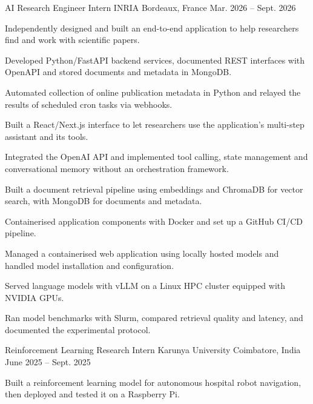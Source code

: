 
\begin{cventries}
  \cventry
    {AI Research Engineer Intern}
    {INRIA}
    {Bordeaux, France}
    {Mar. 2026 -- Sept. 2026}
    {
      \begin{cvitems}
        \item {Independently designed and built an end-to-end application to help researchers find and work with scientific papers.}
        \item {Developed Python/FastAPI backend services, documented REST interfaces with OpenAPI and stored documents and metadata in MongoDB.}
        \item {Automated collection of online publication metadata in Python and relayed the results of scheduled cron tasks via webhooks.}
        \item {Built a React/Next.js interface to let researchers use the application’s multi-step assistant and its tools.}
        \item {Integrated the OpenAI API and implemented tool calling, state management and conversational memory without an orchestration framework.}
        \item {Built a document retrieval pipeline using embeddings and ChromaDB for vector search, with MongoDB for documents and metadata.}
        \item {Containerised application components with Docker and set up a GitHub CI/CD pipeline.}
        \item {Managed a containerised web application using locally hosted models and handled model installation and configuration.}
        \item {Served language models with vLLM on a Linux HPC cluster equipped with NVIDIA GPUs.}
        \item {Ran model benchmarks with Slurm, compared retrieval quality and latency, and documented the experimental protocol.}
      \end{cvitems}
    }

  \cventry
    {Reinforcement Learning Research Intern}
    {Karunya University}
    {Coimbatore, India}
    {June 2025 -- Sept. 2025}
    {
      \begin{cvitems}
        \item {Built a reinforcement learning model for autonomous hospital robot navigation, then deployed and tested it on a Raspberry Pi.}
      \end{cvitems}
    }
\end{cventries}
